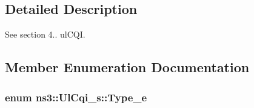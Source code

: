 \subsection{Detailed Description}
See section 4.. ul\+C\+QI. 

\subsection{Member Enumeration Documentation}
\subsubsection[{\texorpdfstring{Type\+\_\+e}{Type_e}}]{\setlength{\rightskip}{0pt plus 5cm}enum {\bf ns3\+::\+Ul\+Cqi\+\_\+s\+::\+Type\+\_\+e}}\hypertarget{structns3_1_1UlCqi__s_aece9e5ebea42eb9ff1744c72c8459b57}{}\label{structns3_1_1UlCqi__s_aece9e5ebea42eb9ff1744c72c8459b57}
